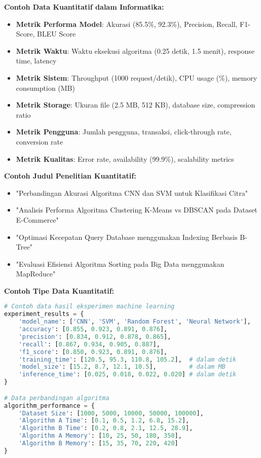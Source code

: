 \textbf{Contoh Data Kuantitatif dalam Informatika:}
\begin{itemize}
    \item \textbf{Metrik Performa Model}: Akurasi (85.5\%, 92.3\%), Precision, Recall, F1-Score, BLEU Score
    \item \textbf{Metrik Waktu}: Waktu eksekusi algoritma (0.25 detik, 1.5 menit), response time, latency
    \item \textbf{Metrik Sistem}: Throughput (1000 request/detik), CPU usage (\%), memory consumption (MB)
    \item \textbf{Metrik Storage}: Ukuran file (2.5 MB, 512 KB), database size, compression ratio
    \item \textbf{Metrik Pengguna}: Jumlah pengguna, transaksi, click-through rate, conversion rate
    \item \textbf{Metrik Kualitas}: Error rate, availability (99.9\%), scalability metrics
\end{itemize}

\textbf{Contoh Judul Penelitian Kuantitatif:}
\begin{itemize}
    \item "Perbandingan Akurasi Algoritma CNN dan SVM untuk Klasifikasi Citra"
    \item "Analisis Performa Algoritma Clustering K-Means vs DBSCAN pada Dataset E-Commerce"
    \item "Optimasi Kecepatan Query Database menggunakan Indexing Berbasis B-Tree"
    \item "Evaluasi Efisiensi Algoritma Sorting pada Big Data menggunakan MapReduce"
\end{itemize}

\textbf{Contoh Tipe Data Kuantitatif:}
\begin{lstlisting}[language=python, style=python, caption=Contoh Data Kuantitatif dalam Penelitian]
# Contoh data hasil eksperimen machine learning
experiment_results = {
    'model_name': ['CNN', 'SVM', 'Random Forest', 'Neural Network'],
    'accuracy': [0.855, 0.923, 0.891, 0.876],
    'precision': [0.834, 0.912, 0.878, 0.865],
    'recall': [0.867, 0.934, 0.905, 0.887],
    'f1_score': [0.850, 0.923, 0.891, 0.876],
    'training_time': [120.5, 95.3, 110.8, 105.2],  # dalam detik
    'model_size': [15.2, 8.7, 12.1, 10.5],         # dalam MB
    'inference_time': [0.025, 0.018, 0.022, 0.020] # dalam detik
}

# Data perbandingan algoritma
algorithm_performance = {
    'Dataset Size': [1000, 5000, 10000, 50000, 100000],
    'Algorithm A Time': [0.1, 0.5, 1.2, 6.8, 15.2],
    'Algorithm B Time': [0.2, 0.8, 2.1, 12.5, 28.9],
    'Algorithm A Memory': [10, 25, 50, 180, 350],
    'Algorithm B Memory': [15, 35, 70, 220, 420]
}
\end{lstlisting}

